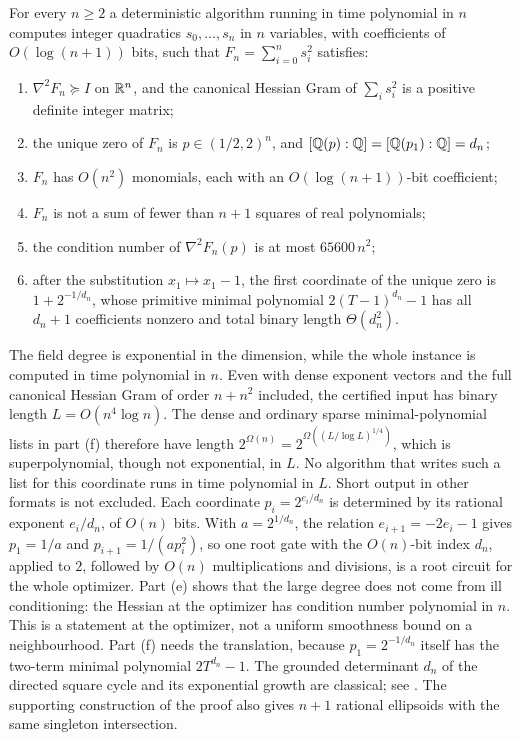 \begin{theorem}
\label{thm:algebraic-cyclic}
For every $n\ge2$ a deterministic algorithm running in time polynomial in $n$
computes integer quadratics $s_0,\ldots,s_n$ in $n$ variables, with
coefficients of $O(\log(n+1))$ bits, such that $F_n=\sum_{i=0}^ns_i^2$
satisfies:
\begin{enumerate}[label=(\alph*)]
\item $\nabla^2F_n\succeq I$ on $\mathbb R^n$, and the canonical Hessian Gram of
  $\sum_is_i^2$ is a positive definite integer matrix;
\item the unique zero of $F_n$ is $p\in(1/2,2)^n$, and
  $[\mathbb Q(p):\mathbb Q]=[\mathbb Q(p_1):\mathbb Q]=d_n$;
\item $F_n$ has $O(n^2)$ monomials, each with an $O(\log(n+1))$-bit
  coefficient;
\item $F_n$ is not a sum of fewer than $n+1$ squares of real polynomials;
\item the condition number of $\nabla^2F_n(p)$ is at most $65600\,n^2$;
\item after the substitution $x_1\mapsto x_1-1$, the first coordinate of the
  unique zero is $1+2^{-1/d_n}$, whose primitive minimal polynomial
  $2(T-1)^{d_n}-1$ has all $d_n+1$ coefficients nonzero and total binary
  length $\Theta(d_n^2)$.
\end{enumerate}
\end{theorem}

The field degree is exponential in the dimension, while the whole instance is
computed in time polynomial in $n$. Even with dense exponent vectors and the
full canonical Hessian Gram of order $n+n^2$ included, the certified input has
binary length $L=O(n^4\log n)$. The dense and ordinary sparse
minimal-polynomial lists in part (f) therefore have length
$2^{\Omega(n)}=2^{\Omega((L/\log L)^{1/4})}$, which is superpolynomial, though
not exponential, in $L$. No algorithm that writes such a list for this
coordinate runs in time polynomial in $L$. Short output in other formats is
not excluded. Each coordinate $p_i=2^{e_i/d_n}$ is determined by its rational
exponent $e_i/d_n$, of $O(n)$ bits. With $a=2^{1/d_n}$, the relation
$e_{i+1}=-2e_i-1$ gives $p_1=1/a$ and $p_{i+1}=1/(ap_i^2)$, so one root gate
with the $O(n)$-bit index $d_n$, applied to $2$, followed by $O(n)$
multiplications and divisions, is a root circuit for the whole optimizer.
Part (e) shows that the large degree does not come from ill conditioning:
the Hessian at the optimizer has condition number polynomial in $n$. This is
a statement at the
optimizer, not a uniform smoothness bound on a neighbourhood.
Part (f) needs the translation, because $p_1=2^{-1/d_n}$ itself has the
two-term minimal polynomial $2T^{d_n}-1$. The grounded determinant $d_n$ of the
directed square cycle and its exponential growth are classical; see
\cite{LoncParolWojciechowski2001}. The supporting construction of the proof
also gives $n+1$ rational ellipsoids with the same singleton intersection.

